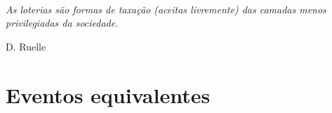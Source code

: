 \newpage
\
\thispagestyle{empty}

\newpage
\
\thispagestyle{empty}

 \appendix


\

\vspace*{1.0cm}


\label{topico}


\setcounter{chapter}{1}

\setcounter{equation}{0}


\begin{flushright}
\begin{minipage}{6.5cm}
{\small
\baselineskip=8pt
{\it As loterias s\~{a}o formas de taxa\c{c}\~{a}o (aceitas livremente) das camadas menos privilegiadas da sociedade.}

\smallskip
\hfill D. Ruelle
}
\end{minipage}
\end{flushright}









\label{topicos}


\section{Eventos equivalentes} 


